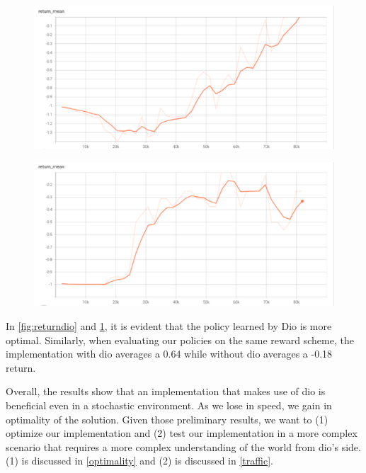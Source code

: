     \begin{figure}[H]
      \centering
      \begin{minipage}{.5\textwidth}
        \centering
        \includegraphics[width=1\linewidth]{figures/dioreturn.png}
        \label{fig:returndio}
      \end{minipage}%
      \begin{minipage}{.5\textwidth}
        \centering
        \includegraphics[width=1\linewidth]{figures/rlreturn.png}
        \label{fig:returnrl}
      \end{minipage}
    \end{figure}

    In \ref{fig:returndio} and \ref{fig:returnrl}, it is evident that the policy learned by Dio 
    is more optimal. Similarly, when evaluating our policies on the same reward scheme, 
    the implementation with dio averages a 0.64 while without dio averages a -0.18 return.

    Overall, the results show that an implementation that makes use of dio is beneficial even in a stochastic environment. 
    As we lose in speed, we gain in optimality of the solution. 
    Given those preliminary results, we want to (1) optimize our implementation 
    and (2) test our implementation in a more complex scenario that requires a more complex understanding of the world 
    from dio's side. (1) is discussed in \ref{optimality} and (2) is discussed in \ref{traffic}. 

